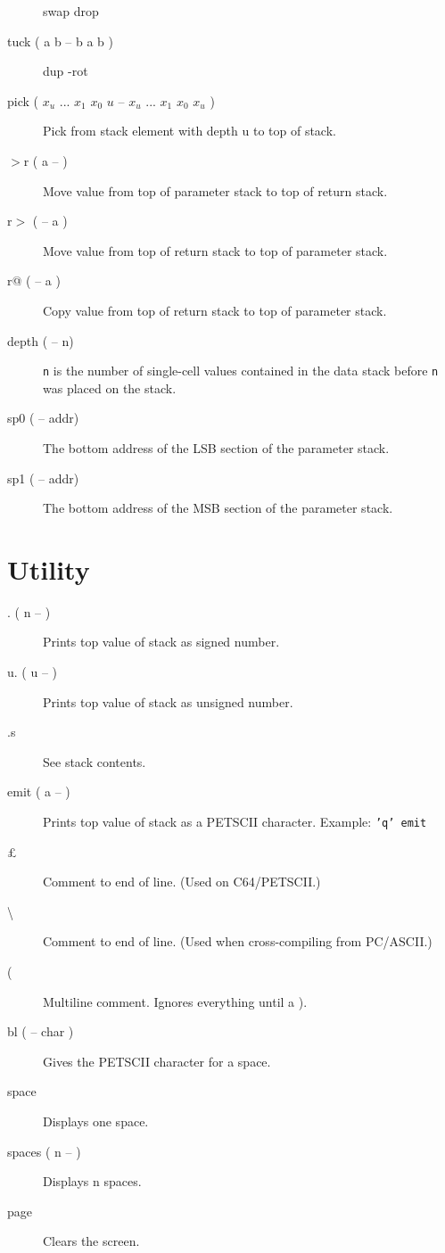 \begin{description}
swap drop

\item[tuck ( a b -- b a b )]

dup -rot

\item[pick ( $x_u$ ... $x_1$ $x_0$ $u$ -- $x_u$ ... $x_1$ $x_0$ $x_u$ )]

Pick from stack element with depth u to top of stack.

\item[$>$r ( a -- )]

Move value from top of parameter stack to top of return stack. 

\item[r$>$ ( -- a )]

Move value from top of return stack to top of parameter stack. 

\item[r@ ( -- a )]

Copy value from top of return stack to top of parameter stack. 

\item[depth ( -- n)] 

\texttt{n} is the number of single-cell values contained in the data stack before \texttt{n} was placed on the stack.

\item[sp0 ( -- addr)] 

The bottom address of the LSB section of the parameter stack.

\item[sp1 ( -- addr)] 

The bottom address of the MSB section of the parameter stack.

\end{description}

\section{Utility}

\begin{description}
\item[. ( n -- )] Prints top value of stack as signed number.
\item[u. ( u -- )] Prints top value of stack as unsigned number.
\item[.s] See stack contents.
\item[emit ( a -- )] Prints top value of stack as a PETSCII character. Example: \texttt{'q' emit}
\item[\pounds] Comment to end of line. (Used on C64/PETSCII.)
\item[\textbackslash] Comment to end of line. (Used when cross-compiling from PC/ASCII.)
\item[(] Multiline comment. Ignores everything until a ).
\item[bl ( -- char )] Gives the PETSCII character for a space.
\item[space] Displays one space.
\item[spaces ( n -- )] Displays n spaces.
\item[page] Clears the screen.
\end{description}

